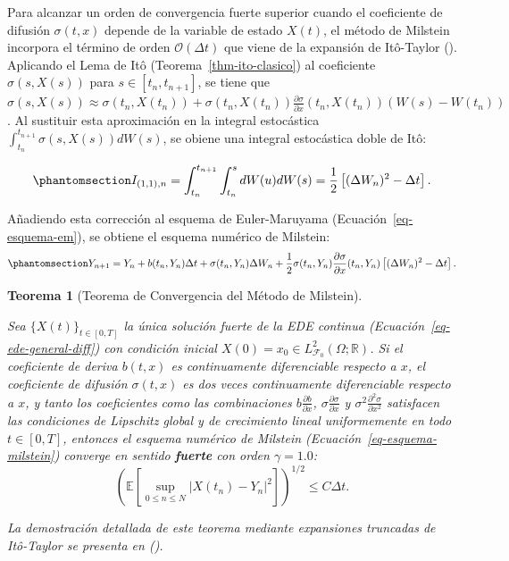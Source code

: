 \documentclass[
  spanish,
  us-letterpaper,
]{scrreprt}
\numberwithin{equation}{section}
\theoremstyle{plain}
\newtheorem{theorem}{Teorema}[chapter]
\theoremstyle{plain}
\theoremstyle{definition}
\theoremstyle{plain}
\theoremstyle{remark}
\begin{document}
Para alcanzar un orden de convergencia fuerte superior cuando el
coeficiente de difusión \(\sigma(t, x)\) depende de la variable de
estado \(X(t)\), el método de Milstein incorpora el término de orden
\(\mathcal{O}(\Delta t)\) que viene de la expansión de Itô-Taylor
(). Aplicando
el Lema de Itô (Teorema~\ref{thm-ito-clasico}) al coeficiente
\(\sigma(s, X(s))\) para \(s \in [t_n, t_{n+1}]\), se tiene que
\(\displaystyle \sigma(s, X(s)) \approx \sigma(t_n, X(t_n)) + \sigma(t_n, X(t_n))\frac{\partial \sigma}{\partial x}(t_n, X(t_n))(W(s) - W(t_n))\).
Al sustituir esta aproximación en la integral estocástica
\(\displaystyle \int_{t_n}^{t_{n+1}} \sigma(s, X(s)) dW(s)\), se obiene
una integral estocástica doble de Itô:

\begin{equation}\phantomsection\label{eq-integral-doble-milstein}{
I_{(1,1), n} = \int_{t_n}^{t_{n+1}} \int_{t_n}^s dW(u) dW(s) = \frac{1}{2}\left[ (\Delta W_n)^2 - \Delta t \right].
}\end{equation}

Añadiendo esta corrección al esquema de Euler-Maruyama
(Ecuación~\ref{eq-esquema-em}), se obtiene el esquema numérico de
Milstein: \begin{equation}\phantomsection\label{eq-esquema-milstein}{
Y_{n+1} = Y_n + b(t_n, Y_n)\Delta t + \sigma(t_n, Y_n)\Delta W_n + \frac{1}{2}\sigma(t_n, Y_n)\frac{\partial \sigma}{\partial x}(t_n, Y_n)\left[ (\Delta W_n)^2 - \Delta t \right].
}\end{equation}

\begin{theorem}[Teorema de Convergencia del Método de
Milstein]\protect\hypertarget{thm-milstein}{}\label{thm-milstein}

Sea \(\{X(t)\}_{t \in [0, T]}\) la única solución fuerte de la EDE
continua (Ecuación~\ref{eq-ede-general-diff}) con condición inicial
\(X(0) = x_0 \in L^2_{\mathcal{F}_0}(\Omega; \mathbb{R})\). Si el
coeficiente de deriva \(b(t, x)\) es continuamente diferenciable
respecto a \(x\), el coeficiente de difusión \(\sigma(t, x)\) es dos
veces continuamente diferenciable respecto a \(x\), y tanto los
coeficientes como las combinaciones
\(\displaystyle b\frac{\partial b}{\partial x}\),
\(\displaystyle \sigma\frac{\partial \sigma}{\partial x}\) y
\(\displaystyle \sigma^2\frac{\partial^2 \sigma}{\partial x^2}\)
satisfacen las condiciones de Lipschitz global y de crecimiento lineal
uniformemente en todo \(t \in [0, T]\), entonces el esquema numérico de
Milstein (Ecuación~\ref{eq-esquema-milstein}) converge en sentido
\textbf{fuerte} con orden \(\gamma = 1.0\): \[
\left( \mathbb{E}\left[ \sup_{0 \le n \le N} \vert X(t_n) - Y_n \vert^2 \right] \right)^{1/2} \le C \Delta t.
\]

La demostración detallada de este teorema mediante expansiones truncadas
de Itô-Taylor se presenta en
().

\end{theorem}
\end{document}
